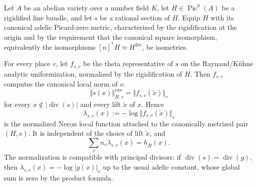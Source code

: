 \documentclass[10pt,a4paper]{amsart}
\theoremstyle{plain}
\theoremstyle{plain}
\numberwithin{equation}{section}
\begin{document}
\begin{prop}
	\label{prop:canonical-picard-zero-theta-metrics}
	\label{input:theta-neron-local-heights}
	Let \(A\) be an abelian variety over a number field \(K\), let
	\(H\in\operatorname{Pic}^0(A)\) be a rigidified line bundle, and let \(s\) be a
	rational section of \(H\).  Equip \(H\) with its canonical adelic Picard-zero
	metric, characterized by the rigidification at the origin and by the requirement
	that the canonical square isomorphism, equivalently the isomorphisms
	\([n]^*H\simeq H^{\otimes n}\), be isometries.
	
	For every place \(v\), let \(f_{s,v}\) be the theta representative of \(s\) on
	the Raynaud/K\"uhne analytic uniformization, normalized by the rigidification of
	\(H\).  Then \(f_{s,v}\) computes the canonical local norm of \(s\):
	\[
	\Vert s(x)\Vert_{H,v}^{can}
	=
	\Vert f_{s,v}(\widetilde x)\Vert_v
	\]
	for every \(x\notin|\operatorname{div}(s)|\) and every lift \(\widetilde x\) of
	\(x\).  Hence
	\[
	\lambda_{s,v}(x):=-\log\Vert f_{s,v}(\widetilde x)\Vert_v
	\]
	is the normalized Neron local function attached to the canonically metrized
	pair \((H,s)\).  It is independent of the choice of lift \(\widetilde x\), and
	\[
	\sum_v n_v\lambda_{s,v}(x)=h_{\overline H}(x).
	\]
	The normalization is compatible with principal divisors: if
	\(\operatorname{div}(s)=\operatorname{div}(g)\), then
	\(\lambda_{s,v}(x)=-\log|g(x)|_v\) up to the usual adelic constant, whose global
	sum is zero by the product formula.
\end{prop}
\end{document}
